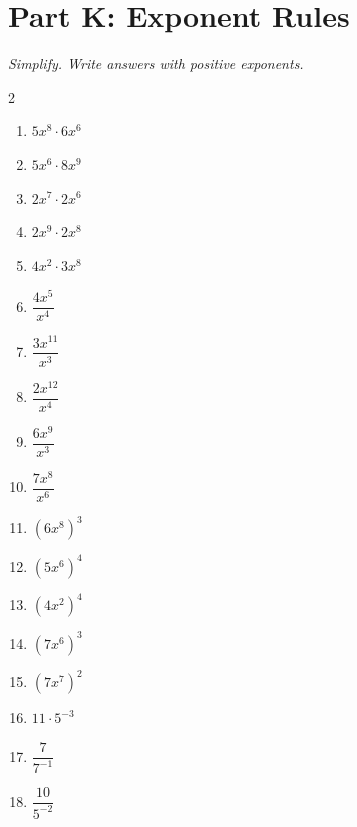 \documentclass[11pt]{article}
\begin{document}
\section*{Part K: Exponent Rules}
\noindent\textit{Simplify. Write answers with positive exponents.}
\begin{multicols}{2}
\begin{enumerate}
  \item $5x^{8} \cdot 6x^{6}$
  \vspace{1.3cm}
  \item $5x^{6} \cdot 8x^{9}$
  \vspace{1.3cm}
  \item $2x^{7} \cdot 2x^{6}$
  \vspace{1.3cm}
  \item $2x^{9} \cdot 2x^{8}$
  \vspace{1.3cm}
  \item $4x^{2} \cdot 3x^{8}$
  \vspace{1.3cm}
  \item $\dfrac{4x^{5}}{x^{4}}$
  \vspace{1.3cm}
  \item $\dfrac{3x^{11}}{x^{3}}$
  \vspace{1.3cm}
  \item $\dfrac{2x^{12}}{x^{4}}$
  \vspace{1.3cm}
  \item $\dfrac{6x^{9}}{x^{3}}$
  \vspace{1.3cm}
  \item $\dfrac{7x^{8}}{x^{6}}$
  \vspace{1.3cm}
  \item $(6x^{8})^{3}$
  \vspace{1.3cm}
  \item $(5x^{6})^{4}$
  \vspace{1.3cm}
  \item $(4x^{2})^{4}$
  \vspace{1.3cm}
  \item $(7x^{6})^{3}$
  \vspace{1.3cm}
  \item $(7x^{7})^{2}$
  \vspace{1.3cm}
  \item $11 \cdot 5^{-3}$
  \vspace{1.3cm}
  \item $\dfrac{7}{7^{-1}}$
  \vspace{1.3cm}
  \item $\dfrac{10}{5^{-2}}$
  \vspace{1.3cm}

\end{enumerate}
\end{multicols}
\end{document}
